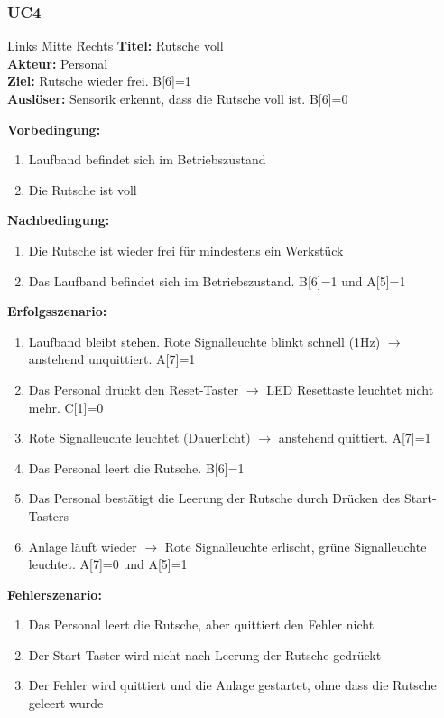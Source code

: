 \documentclass[oneside,a4paper,titlepage]{scrartcl} %
\begin{document}
\subsubsection{UC4}
\begin{tabbing}
 Links \= Mitte \= Rechts \kill
 \textbf{Titel:} \> \> Rutsche voll\\
 \textbf{Akteur:} \> \> Personal\\
 \textbf{Ziel:} \> \> Rutsche wieder frei. B[6]=1\\
 \textbf{Auslöser:} \> \> Sensorik erkennt, dass die Rutsche voll ist. B[6]=0\\
\end{tabbing}
\textbf{Vorbedingung:}
\begin{enumerate}
 \item Laufband befindet sich im Betriebszustand
 \item Die Rutsche ist voll
\end{enumerate}
\textbf{Nachbedingung:}
\begin{enumerate}
 \item Die Rutsche ist wieder frei für mindestens ein Werkstück
 \item Das Laufband befindet sich im Betriebszustand. B[6]=1 und A[5]=1
\end{enumerate}
\textbf{Erfolgsszenario:}
\begin{enumerate}
 \item Laufband bleibt stehen. Rote Signalleuchte blinkt schnell (1Hz) $\rightarrow$ anstehend unquittiert. A[7]=1
 \item Das Personal drückt den Reset-Taster $\rightarrow$ LED Resettaste leuchtet nicht mehr. C[1]=0
 \item Rote Signalleuchte leuchtet (Dauerlicht) $\rightarrow$ anstehend quittiert. A[7]=1
 \item Das Personal leert die Rutsche. B[6]=1
 \item Das Personal bestätigt die Leerung der Rutsche durch Drücken des Start-Tasters
 \item Anlage läuft wieder $\rightarrow$ Rote Signalleuchte erlischt, grüne Signalleuchte leuchtet. A[7]=0 und A[5]=1
\end{enumerate}
\textbf{Fehlerszenario:}
\begin{enumerate}
 \item Das Personal leert die Rutsche, aber quittiert den Fehler nicht
 \item Der Start-Taster wird nicht nach Leerung der Rutsche gedrückt
 \item Der Fehler wird quittiert und die Anlage gestartet, ohne dass die Rutsche geleert wurde
\end{enumerate}
\end{document}
